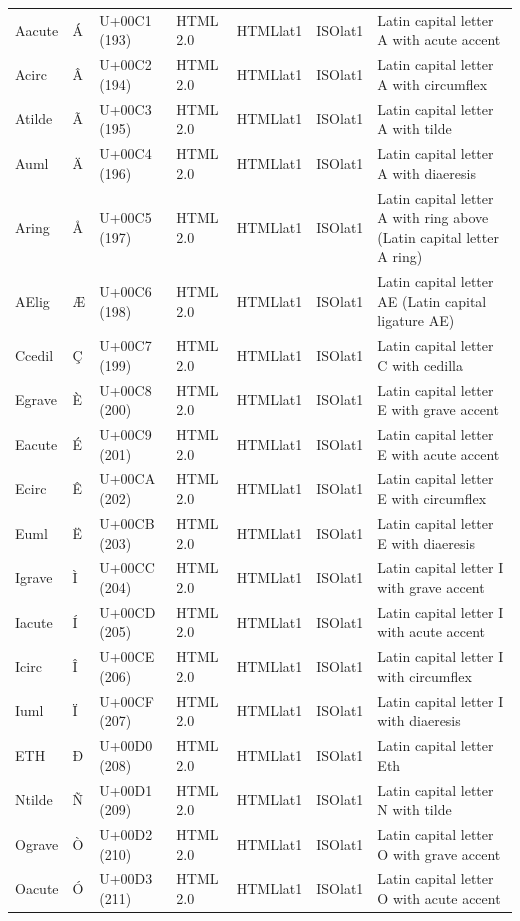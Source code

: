 \documentclass{article}
\begin{document}
\begin{tabular}{lllllll}
Aacute & Á & U+00C1 (193) & HTML 2.0 & HTMLlat1 & ISOlat1 & Latin capital letter A with acute accent \\
Acirc & Â & U+00C2 (194) & HTML 2.0 & HTMLlat1 & ISOlat1 & Latin capital letter A with circumflex \\
Atilde & Ã & U+00C3 (195) & HTML 2.0 & HTMLlat1 & ISOlat1 & Latin capital letter A with tilde \\
Auml & Ä & U+00C4 (196) & HTML 2.0 & HTMLlat1 & ISOlat1 & Latin capital letter A with diaeresis \\
Aring & Å & U+00C5 (197) & HTML 2.0 & HTMLlat1 & ISOlat1 & Latin capital letter A with ring above (Latin capital letter A ring) \\
AElig & Æ & U+00C6 (198) & HTML 2.0 & HTMLlat1 & ISOlat1 & Latin capital letter AE (Latin capital ligature AE) \\
Ccedil & Ç & U+00C7 (199) & HTML 2.0 & HTMLlat1 & ISOlat1 & Latin capital letter C with cedilla \\
Egrave & È & U+00C8 (200) & HTML 2.0 & HTMLlat1 & ISOlat1 & Latin capital letter E with grave accent \\
Eacute & É & U+00C9 (201) & HTML 2.0 & HTMLlat1 & ISOlat1 & Latin capital letter E with acute accent \\
Ecirc & Ê & U+00CA (202) & HTML 2.0 & HTMLlat1 & ISOlat1 & Latin capital letter E with circumflex \\
Euml & Ë & U+00CB (203) & HTML 2.0 & HTMLlat1 & ISOlat1 & Latin capital letter E with diaeresis \\
Igrave & Ì & U+00CC (204) & HTML 2.0 & HTMLlat1 & ISOlat1 & Latin capital letter I with grave accent \\
Iacute & Í & U+00CD (205) & HTML 2.0 & HTMLlat1 & ISOlat1 & Latin capital letter I with acute accent \\
Icirc & Î & U+00CE (206) & HTML 2.0 & HTMLlat1 & ISOlat1 & Latin capital letter I with circumflex \\
Iuml & Ï & U+00CF (207) & HTML 2.0 & HTMLlat1 & ISOlat1 & Latin capital letter I with diaeresis \\
ETH & Ð & U+00D0 (208) & HTML 2.0 & HTMLlat1 & ISOlat1 & Latin capital letter Eth \\
Ntilde & Ñ & U+00D1 (209) & HTML 2.0 & HTMLlat1 & ISOlat1 & Latin capital letter N with tilde \\
Ograve & Ò & U+00D2 (210) & HTML 2.0 & HTMLlat1 & ISOlat1 & Latin capital letter O with grave accent \\
Oacute & Ó & U+00D3 (211) & HTML 2.0 & HTMLlat1 & ISOlat1 & Latin capital letter O with acute accent \\

\end{tabular}
\end{document}
